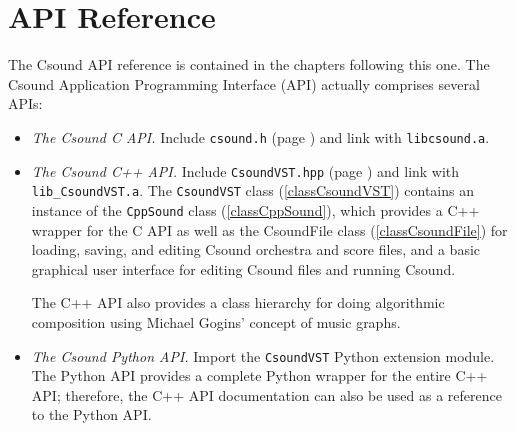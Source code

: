 \documentclass[10pt,letterpaper,onecolumn]{book}
\begin{document}
\chapter{API Reference}

The Csound API reference is contained in the chapters following this one. The Csound Application Programming Interface (API) actually comprises several APIs:

\begin{itemize}

\item \emph{The Csound C API.} Include \texttt{csound.h} (page \pageref{csound_8h}) and link with \texttt{libcsound.a}.

\item \emph{The Csound C++ API.} Include \texttt{CsoundVST.hpp} (page \pageref{CsoundVST_8hpp}) and link with \verb|lib_CsoundVST.a|. The \texttt{CsoundVST} class (\ref{classCsoundVST}) contains an instance of the \texttt{CppSound} class (\ref{classCppSound}), which provides a C++ wrapper for the C API as well as the CsoundFile class (\ref{classCsoundFile}) for loading, saving, and editing Csound orchestra and score files, and a basic graphical user interface for editing Csound files and running Csound. 

The C++ API also provides a class hierarchy for doing algorithmic composition using Michael Gogins' concept of music graphs.

\item \emph{The Csound Python API.} Import the \texttt{CsoundVST} Python extension module. The Python API provides a complete Python wrapper for the entire C++ API; therefore, the C++ API documentation can also be used as a reference to the Python API.

\end{itemize}
\end{document}
